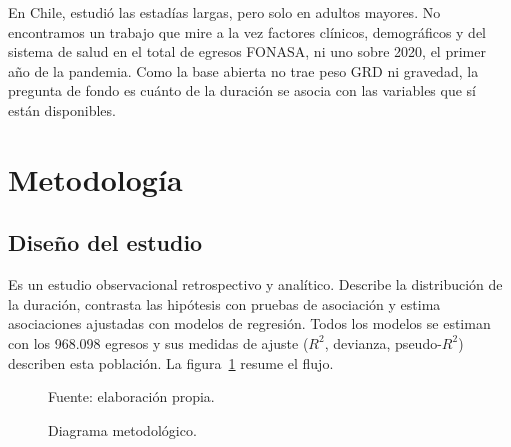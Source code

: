 \documentclass[10.5pt,a4paper,headings=small,abstract=false,bibliography=totoc,listof=totoc]{scrartcl}
\begin{document}
En Chile, \citet{olivares2020} estudió las estadías largas, pero solo en adultos mayores. No encontramos un trabajo que mire a la vez factores clínicos, demográficos y del sistema de salud en el total de egresos FONASA, ni uno sobre 2020, el primer año de la pandemia. Como la base abierta no trae peso GRD ni gravedad, la pregunta de fondo es cuánto de la duración se asocia con las variables que sí están disponibles.

\section{Metodología}

\subsection{Diseño del estudio}

Es un estudio observacional retrospectivo y analítico. Describe la distribución de la duración, contrasta las hipótesis con pruebas de asociación y estima asociaciones ajustadas con modelos de regresión. Todos los modelos se estiman con los 968.098 egresos y sus medidas de ajuste ($R^2$, devianza, pseudo-$R^2$) describen esta población. La figura~\ref{fig:diagrama} resume el flujo.

\begin{figure}[!htb]
\centering
\caption{Diagrama metodológico.}
\label{fig:diagrama}
{\footnotesize\color{gris}Fuente: elaboración propia.\par}
\end{figure}
\end{document}
